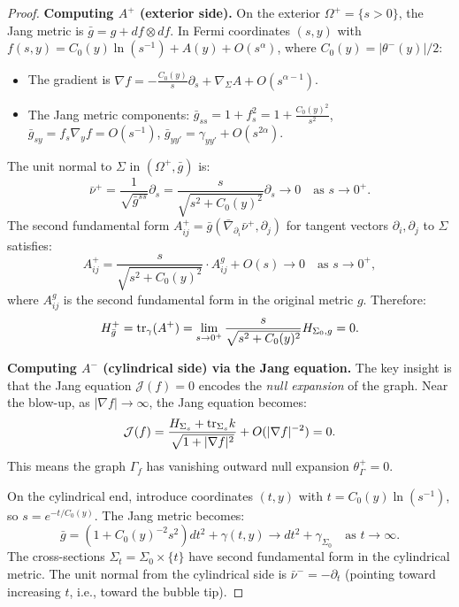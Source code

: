 \begin{proof}
\textbf{Computing $A^+$ (exterior side).} On the exterior $\Omega^+ = \{s > 0\}$, the Jang metric is $\bar{g} = g + df \otimes df$. In Fermi coordinates $(s, y)$ with $f(s,y) = C_0(y) \ln(s^{-1}) + A(y) + O(s^\alpha)$, where $C_0(y) = |\theta^-(y)|/2$:
\begin{itemize}
    \item The gradient is $\nabla f = -\frac{C_0(y)}{s}\partial_s + \nabla_\Sigma A + O(s^{\alpha-1})$.
    \item The Jang metric components: $\bar{g}_{ss} = 1 + f_s^2 = 1 + \frac{C_0(y)^2}{s^2}$, $\bar{g}_{sy} = f_s \nabla_y f = O(s^{-1})$, $\bar{g}_{yy'} = \gamma_{yy'} + O(s^{2\alpha})$.
\end{itemize}

The unit normal to $\Sigma$ in $(\Omega^+, \bar{g})$ is:
\[
    \bar{\nu}^+ = \frac{1}{\sqrt{\bar{g}^{ss}}}\partial_s = \frac{s}{\sqrt{s^2 + C_0(y)^2}}\partial_s \to 0 \quad \text{as } s \to 0^+.
\]
The second fundamental form $A^+_{ij} = \bar{g}(\bar{\nabla}_{\partial_i}\bar{\nu}^+, \partial_j)$ for tangent vectors $\partial_i, \partial_j$ to $\Sigma$ satisfies:
\[
    A^+_{ij} = \frac{s}{\sqrt{s^2 + C_0(y)^2}} \cdot A^g_{ij} + O(s) \to 0 \quad \text{as } s \to 0^+,
\]
where $A^g_{ij}$ is the second fundamental form in the original metric $g$. Therefore:
\begin{equation}\label{eq:Hplus}
    H^+_{\bar{g}} = \mathrm{tr}_\gamma(A^+) = \lim_{s \to 0^+} \frac{s}{\sqrt{s^2 + C_0(y)^2}} H_{\Sigma_0, g} = 0.
\end{equation}

\textbf{Computing $A^-$ (cylindrical side) via the Jang equation.} The key insight is that the Jang equation $\mathcal{J}(f) = 0$ encodes the \emph{null expansion} of the graph. Near the blow-up, as $|\nabla f| \to \infty$, the Jang equation becomes:
\begin{equation}\label{eq:JangAsymptotic}
    \mathcal{J}(f) = \frac{H_{\Sigma_s} + \mathrm{tr}_{\Sigma_s} k}{\sqrt{1 + |\nabla f|^2}} + O(|\nabla f|^{-2}) = 0.
\end{equation}
This means the graph $\Gamma_f$ has vanishing outward null expansion $\theta^+_\Gamma = 0$.

On the cylindrical end, introduce coordinates $(t, y)$ with $t = C_0(y) \ln(s^{-1})$, so $s = e^{-t/C_0(y)}$. The Jang metric becomes:
\[
    \bar{g} = (1 + C_0(y)^{-2}s^2)dt^2 + \gamma(t,y) \to dt^2 + \gamma_{\Sigma_0} \quad \text{as } t \to \infty.
\]
The cross-sections $\Sigma_t = \Sigma_0 \times \{t\}$ have second fundamental form in the cylindrical metric. The unit normal from the cylindrical side is $\bar{\nu}^- = -\partial_t$ (pointing toward increasing $t$, i.e., toward the bubble tip).


\end{proof}
